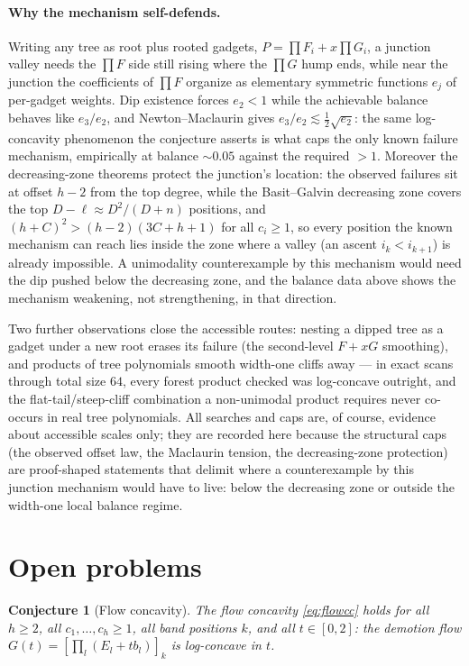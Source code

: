 \documentclass[11pt]{article}
\newtheorem{conjecture}[theorem]{Conjecture}
\theoremstyle{definition}
\begin{document}
\paragraph{Why the mechanism self-defends.}
Writing any tree as root plus rooted gadgets,
$P=\prod F_i+x\prod G_i$, a junction valley needs the $\prod F$ side
still rising where the $\prod G$ hump ends, while near the junction
the coefficients of $\prod F$ organize as elementary symmetric
functions $e_j$ of per-gadget weights.  Dip existence forces
$e_2<1$ while the achievable balance behaves like $e_3/e_2$, and
Newton--Maclaurin gives $e_3/e_2\lesssim\tfrac12\sqrt{e_2}$: the same
log-concavity phenomenon the conjecture asserts is what caps the only
known failure mechanism, empirically at balance ${\sim}0.05$ against
the required $>1$.  Moreover the decreasing-zone theorems protect the junction's
location: the observed failures sit at offset $h-2$ from the top
degree, while the Basit--Galvin decreasing zone covers the top
$D-\ell\approx D^2/(D+n)$ positions, and
$(h+C)^2>(h-2)(3C+h+1)$ for all $c_i\ge1$, so every position the
known mechanism can reach lies inside the zone where a valley
(an ascent $i_k<i_{k+1}$) is already impossible.  A unimodality
counterexample by this mechanism would need the dip pushed below the
decreasing zone, and the balance data above shows the mechanism
weakening, not strengthening, in that direction.

Two further observations close the accessible routes: nesting a
dipped tree as a gadget under a new root erases its failure (the
second-level $F+xG$ smoothing), and products of tree polynomials
smooth width-one cliffs away --- in exact scans through total size
$64$, every forest product checked was log-concave outright, and the
flat-tail/steep-cliff combination a non-unimodal product requires
never co-occurs in real tree polynomials.  All searches and caps are,
of course, evidence about accessible scales only; they are recorded
here because the structural caps (the observed offset law, the Maclaurin
tension, the decreasing-zone protection) are proof-shaped statements
that delimit where a counterexample by this junction mechanism would
have to live: below the decreasing zone or outside the width-one local
balance regime.

\section{Open problems}\label{sec:open}

\begin{conjecture}[Flow concavity]\label{conj:ecore}
The flow concavity \eqref{eq:flowcc} holds for all $h\ge2$, all
$c_1,\dots,c_h\ge1$, all band positions $k$, and all $t\in[0,2]$:
the demotion flow $G(t)=[\prod_l(E_l+tb_l)]_k$ is log-concave in $t$.
\end{conjecture}
\end{document}
